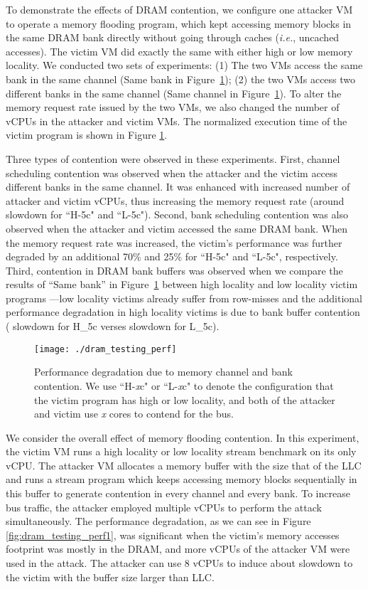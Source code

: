 \documentclass{sig-alternate}
\newcommand{\ie}{\emph{i.e.}\xspace}
\begin{document}
To demonstrate the effects of DRAM contention, we configure one attacker VM to operate 
a memory flooding program, which kept accessing memory 
blocks in the same DRAM bank directly without going through 
caches (\ie, uncached accesses). The victim VM did exactly the same
with either high or low memory locality. We conducted
two sets of experiments: (1) The two VMs access the same bank in the same
channel (Same bank in Figure~\ref{fig:dram_testing_perf}); (2) the two VMs access two different banks
in the same channel (Same channel in Figure~\ref{fig:dram_testing_perf}). 
To alter the memory request rate issued by the two VMs, we also changed 
the number of vCPUs in the attacker and victim VMs. The normalized execution 
time of the victim program is shown in Figure \ref{fig:dram_testing_perf}. 

Three types of contention were observed in these experiments. First,
channel scheduling contention was observed when the attacker and the
victim access different banks in the same channel. It was enhanced
with increased number of attacker and victim vCPUs, thus increasing the
memory request rate (around  slowdown for ``H-5c" and
``L-5c"). Second, bank scheduling contention was also observed when
the attacker and victim accessed the same DRAM bank. When the memory
request rate was increased, the victim's performance was further
degraded by an additional 70\% and 25\% for ``H-5c"
and ``L-5c", respectively. Third, contention in DRAM bank buffers
was observed when we compare the results of ``Same bank'' in Figure~\ref{fig:dram_testing_perf}
between high locality and low
locality victim programs ---low locality victims already suffer from
row-misses and the additional performance degradation in high locality
victims is due to bank buffer contention ( slowdown for
H\_5c verses  slowdown for
L\_5c).

\begin{figure}[h]
\centerline{\mbox{\texttt{[image: ./dram\_testing\_perf]}} }
\caption{Performance degradation due to memory channel and bank
contention. We use ``H-\emph{x}c" or ``L-\emph{x}c" to denote the configuration that the
victim program has high or low locality, and both of the attacker and victim use \emph{x} cores to contend for the bus.}
\label{fig:dram_testing_perf}
\end{figure}

We consider the overall effect of memory flooding contention. 
In this experiment, the victim VM runs a high locality or low 
locality stream benchmark on its only vCPU. The attacker VM allocates 
a memory buffer with the size  that of the LLC and runs a 
stream program which keeps accessing memory blocks sequentially 
in this buffer to generate contention in every channel and every bank. 
To increase bus traffic, the attacker employed multiple vCPUs to perform 
the attack simultaneously. The performance degradation, as we can 
see in Figure \ref{fig:dram_testing_perf1}, was significant when the victim's
memory accesses footprint was mostly in the DRAM, and more vCPUs of the attacker VM
were used in the attack.
The attacker can use 8 vCPUs to induce about  slowdown to 
the victim with the buffer size larger than LLC.
\end{document}
